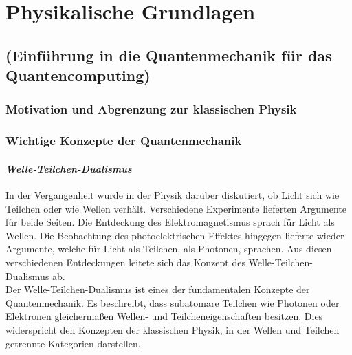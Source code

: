 \chapter{Physikalische Grundlagen}
\label{physics} %



\section{(Einführung in die Quantenmechanik für das Quantencomputing)}
\subsection{Motivation und Abgrenzung zur klassischen Physik }
\subsection{Wichtige Konzepte der Quantenmechanik }

\subsubsection*{\textit{Welle-Teilchen-Dualismus}}

In der Vergangenheit wurde in der Physik darüber diskutiert, ob Licht sich wie Teilchen oder wie Wellen verhält. Verschiedene Experimente lieferten Argumente für beide Seiten. Die Entdeckung des Elektromagnetismus sprach für Licht als Wellen. Die Beobachtung des photoelektrischen Effektes hingegen lieferte wieder Argumente, welche für Licht als Teilchen, als Photonen, sprachen. Aus diesen verschiedenen Entdeckungen leitete sich das Konzept des Welle-Teilchen-Dualismus ab.\\

Der Welle-Teilchen-Dualismus ist eines der fundamentalen Konzepte der Quantenmechanik. Es beschreibt, dass subatomare Teilchen wie Photonen oder Elektronen gleichermaßen Wellen- und Teilcheneigenschaften besitzen. Dies widerspricht den Konzepten der klassischen Physik, in der Wellen und Teilchen getrennte Kategorien darstellen. \\

